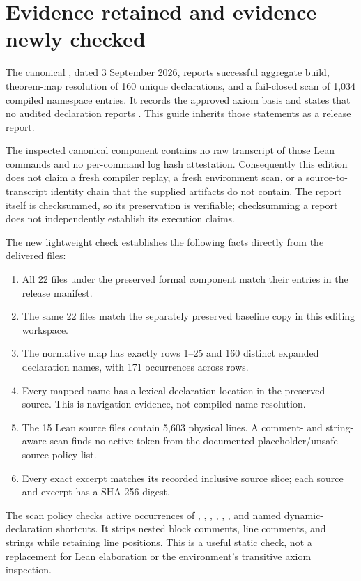 \section{Evidence retained and evidence newly checked}\label{sec:evidence}

The canonical , dated 3 September 2026, reports successful aggregate build, theorem-map resolution of 160 unique declarations, and a fail-closed scan of 1,034 compiled namespace entries. It records the approved axiom basis and states that no audited declaration reports . This guide inherits those statements as a release report.

The inspected canonical component contains no raw transcript of those Lean commands and no per-command log hash attestation. Consequently this edition does not claim a fresh compiler replay, a fresh environment scan, or a source-to-transcript identity chain that the supplied artifacts do not contain. The report itself is checksummed, so its preservation is verifiable; checksumming a report does not independently establish its execution claims.

The new lightweight check establishes the following facts directly from the delivered files:
\begin{enumerate}
\item All 22 files under the preserved formal component match their entries in the release  manifest.
\item The same 22 files match the separately preserved baseline copy in this editing workspace.
\item The normative map has exactly rows 1--25 and 160 distinct expanded declaration names, with 171 occurrences across rows.
\item Every mapped name has a lexical declaration location in the preserved source. This is navigation evidence, not compiled name resolution.
\item The 15 Lean source files contain 5,603 physical lines. A comment- and string-aware scan finds no active token from the documented placeholder/unsafe source policy list.
\item Every exact excerpt matches its recorded inclusive source slice; each source and excerpt has a SHA-256 digest.
\end{enumerate}

The scan policy checks active occurrences of , , , , , , and named dynamic-declaration shortcuts. It strips nested block comments, line comments, and strings while retaining line positions. This is a useful static check, not a replacement for Lean elaboration or the environment's transitive axiom inspection.

